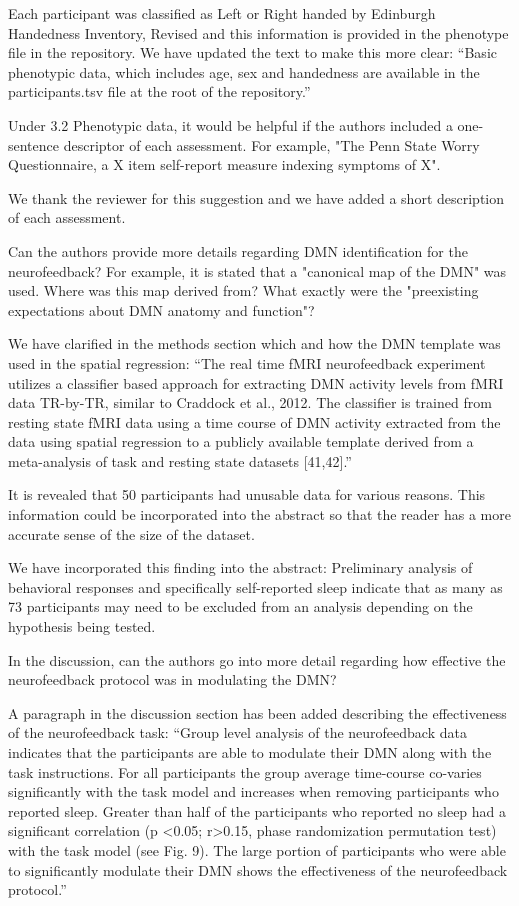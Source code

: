 \documentclass{article}
\newcommand{\RESPONSE}[1]{\textcolor{responseblue}{#1}}
\begin{document}
\RESPONSE{Each participant was classified as Left or Right handed by Edinburgh Handedness Inventory, Revised and this information is provided in the phenotype file in the repository. We have updated the text to make this more clear: ``Basic phenotypic data, which includes age, sex and handedness are available in the participants.tsv file at the root of the repository.''}

Under 3.2 Phenotypic data, it would be helpful if the authors included a one-sentence descriptor of each assessment. For example, "The Penn State Worry Questionnaire, a X item self-report measure indexing symptoms of X".

\RESPONSE{We thank the reviewer for this suggestion and we have added a short description of each assessment.}

Can the authors provide more details regarding DMN identification for the neurofeedback? For example, it is stated that a "canonical map of the DMN" was used. Where was this map derived from? What exactly were the "preexisting expectations about DMN anatomy and function"?

\RESPONSE{We have clarified in the methods section which and how the DMN template was used in the spatial regression: ``The real time fMRI neurofeedback experiment utilizes a classifier based approach for extracting DMN activity levels from fMRI data TR-by-TR, similar to Craddock et al., 2012. The classifier is trained from resting state fMRI data using a time course of DMN activity extracted from the data using spatial regression to a publicly available template derived from a meta-analysis of task and resting state datasets [41,42].'' }

It is revealed that 50 participants had unusable data for various reasons. This information could be incorporated into the abstract so that the reader has a more accurate sense of the size of the dataset.

\RESPONSE{We have incorporated this finding into the abstract: Preliminary analysis of behavioral responses and specifically self-reported sleep indicate that as many as 73 participants may need to be excluded from an analysis depending on the hypothesis being tested.}

In the discussion, can the authors go into more detail regarding how effective the neurofeedback protocol was in modulating the DMN?

\RESPONSE{A paragraph in the discussion section has been added describing the effectiveness of the neurofeedback task: ``Group level analysis of the neurofeedback data indicates that the participants are able to modulate their DMN along with the task instructions. For all participants the group average time-course co-varies significantly with the task model and increases when removing participants who reported sleep. Greater than half of the  participants who reported no sleep had a  significant correlation (p \textless 0.05; r\textgreater 0.15, phase randomization permutation test) with the task model (see Fig. 9). The large portion of participants who were able to significantly modulate their DMN shows the effectiveness of the neurofeedback protocol.''}
\end{document}
